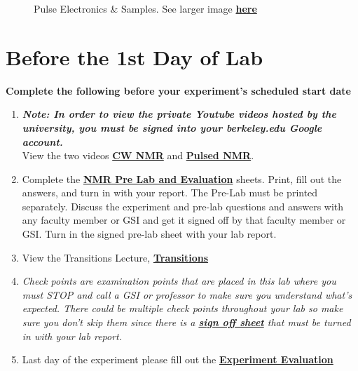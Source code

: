\documentclass{../lab}
\begin{document}
\begin{figure}[h]
\begin{minipage}{0.20\textwidth}
    \caption{Pulse Electronics \& Samples. See larger image \href{http://experimentationlab.berkeley.edu/sites/default/files/images/PNMR_3495.jpg}{\textbf{here}}}
\end{minipage}
\end{figure}

\section{Before the 1st Day of Lab}

\textbf{Complete the following before your experiment's scheduled start date}

\begin{enumerate}
    \item \emph{\textbf{Note: In order to view the private Youtube videos hosted by the university, you must be signed into your berkeley.edu Google account.}}\\
    View the two videos \href{http://youtu.be/q\_Rtbr7YEJY}{\textbf{CW NMR}} and \href{http://youtu.be/\_sXDn-ChOUY}{\textbf{Pulsed NMR}}.

    \item Complete the \href{http://experimentationlab.berkeley.edu/NMRPreLab}{\textbf{NMR Pre Lab and Evaluation}} sheets. Print, fill out the answers, and turn in with your report. The Pre-Lab must be printed separately. Discuss the experiment and pre-lab questions and answers with any faculty member or GSI and get it signed off by that faculty member or GSI. Turn in the signed pre-lab sheet with your lab report.

    \item View the Transitions Lecture, \href{http://youtu.be/xOMgdVP3AfE}{\textbf{Transitions}}

    \item \emph{Check points are examination points that are placed in this lab where you must STOP and call a GSI or professor to make sure you understand what's expected. There could  be multiple check points throughout your lab so make sure you don't skip them since there is a \href{http://experimentationlab.berkeley.edu/nmrcheckpoints}{\textbf{sign off sheet}} that must be turned in with your lab report.}

    \item Last day of the experiment please fill out the \href{\ExperimentEvaluation}{\textbf{Experiment Evaluation}}

\end{enumerate}
\end{document}
